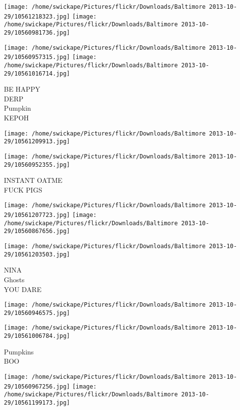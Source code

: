 \documentclass[10pt,letterpaper]{article}
\begin{document}
\texttt{[image: /home/swickape/Pictures/flickr/Downloads/Baltimore 2013-10-29/10561218323.jpg]}
\texttt{[image: /home/swickape/Pictures/flickr/Downloads/Baltimore 2013-10-29/10560981736.jpg]}

\texttt{[image: /home/swickape/Pictures/flickr/Downloads/Baltimore 2013-10-29/10560957315.jpg]}
\texttt{[image: /home/swickape/Pictures/flickr/Downloads/Baltimore 2013-10-29/10561016714.jpg]}

BE HAPPY\\
DERP\\
Pumpkin\\
KEPOH\\
\pagebreak

\texttt{[image: /home/swickape/Pictures/flickr/Downloads/Baltimore 2013-10-29/10561209913.jpg]}

\vspace{0.25in}
\texttt{[image: /home/swickape/Pictures/flickr/Downloads/Baltimore 2013-10-29/10560952355.jpg]}

INSTANT OATME\\
FUCK PIGS\\
\pagebreak

\texttt{[image: /home/swickape/Pictures/flickr/Downloads/Baltimore 2013-10-29/10561207723.jpg]}
\texttt{[image: /home/swickape/Pictures/flickr/Downloads/Baltimore 2013-10-29/10560867656.jpg]}

\texttt{[image: /home/swickape/Pictures/flickr/Downloads/Baltimore 2013-10-29/10561203503.jpg]}

NINA\\
Ghosts\\
YOU DARE\\
\pagebreak

\texttt{[image: /home/swickape/Pictures/flickr/Downloads/Baltimore 2013-10-29/10560946575.jpg]}

\vspace{0.25in}
\texttt{[image: /home/swickape/Pictures/flickr/Downloads/Baltimore 2013-10-29/10561006784.jpg]}

Pumpkins\\
BOO\\
\pagebreak

\texttt{[image: /home/swickape/Pictures/flickr/Downloads/Baltimore 2013-10-29/10560967256.jpg]}
\texttt{[image: /home/swickape/Pictures/flickr/Downloads/Baltimore 2013-10-29/10561199173.jpg]}
\end{document}
